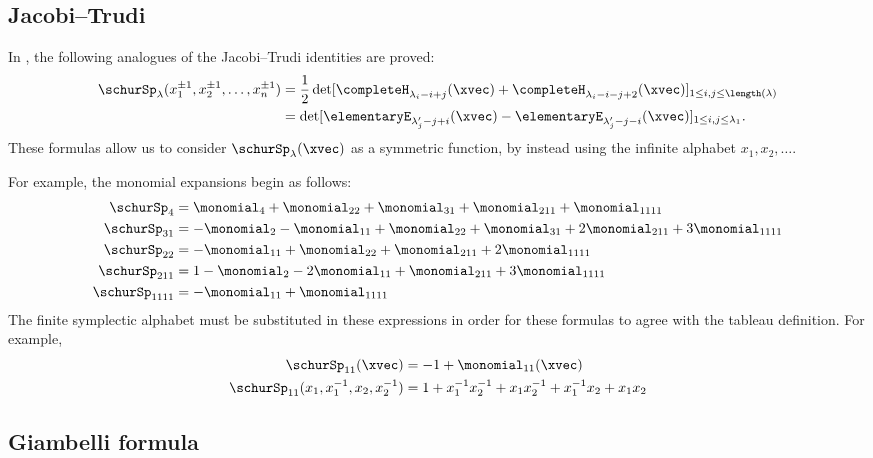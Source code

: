 \subsection[schurSymplecticJacobiTrudi]{Jacobi--Trudi}

In \cite{FulmekKrattenthaler1997}, the following analogues of the
Jacobi--Trudi identities are proved:
\begin{align}
\schurSp_\lambda(x^{\pm 1}_{1},x^{\pm 1}_{2},\dotsc, x^{\pm 1}_{n})
& = \frac{1}{2}
\det[ \completeH_{\lambda_i - i+j}(\xvec)
      + \completeH_{\lambda_i - i- j + 2}(\xvec) ]_{1\leq i,j \leq \length(\lambda)} \\
& = \det[ \elementaryE_{\lambda'_j - j+i}(\xvec) - \elementaryE_{\lambda'_j - j- i}(\xvec) ]_{1\leq i,j \leq \lambda_1}.
\end{align}
These formulas allow us to consider $\schurSp_\lambda(\xvec)$ as a symmetric
function, by instead using the infinite alphabet $x_1,x_2,\dotsc$.

\begin{example}
For example, the monomial expansions begin as follows:
\begin{align}
\schurSp_{4}  &= \monomial_{4} + \monomial_{22} + \monomial_{31}+\monomial_{211}+\monomial_{1111} \\
\schurSp_{31} &= -\monomial_{2} - \monomial_{11} + \monomial_{22}+\monomial_{31}+2\monomial_{211}+3\monomial_{1111} \\
\schurSp_{22} &= - \monomial_{11} + \monomial_{22} + \monomial_{211}+2\monomial_{1111} \\
\schurSp_{211} &= 1 - \monomial_{2} -2 \monomial_{11} + \monomial_{211} + 3\monomial_{1111} \\
\schurSp_{1111} &= - \monomial_{11} + \monomial_{1111}
\end{align}
The finite symplectic alphabet must be substituted in these expressions in
order for these formulas to agree with the tableau definition.
For example,
\begin{align}
\schurSp_{11}(\xvec) &= - 1 + \monomial_{11}(\xvec)\\
\schurSp_{11}(x_1,x_1^{-1},x_2,x_2^{-1}) &=
1 + x_1^{-1}x_2^{-1} + x_1x^{-1}_2+x^{-1}_1x_2 + x_1x_2
\end{align}
\end{example}


\subsection[schurSymplecticGiambelli]{Giambelli formula}

